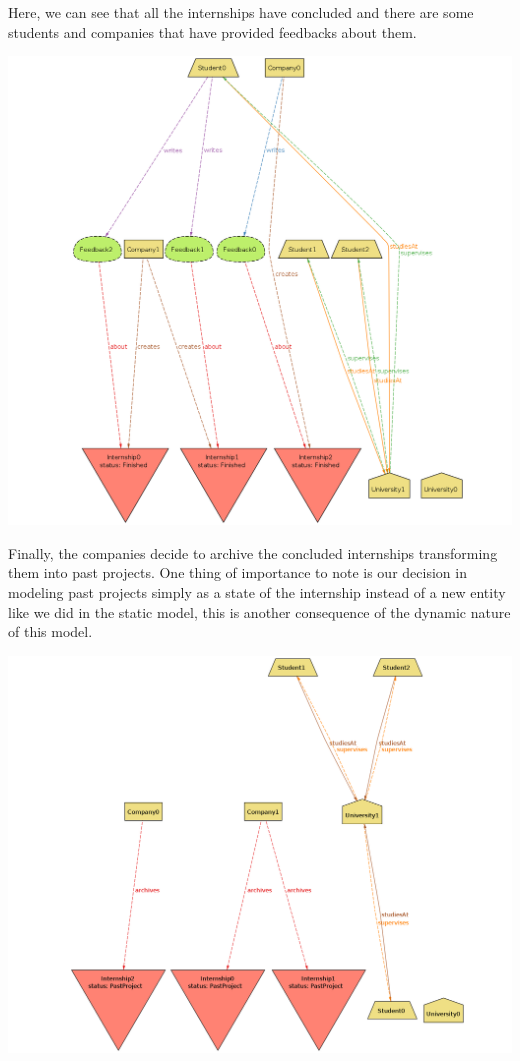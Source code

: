\documentclass[11pt,twoside]{article}
\begin{document}
\newpage
Here, we can see that all the internships have concluded and there are some students and companies that have provided feedbacks about them.
\begin{center}
\includegraphics[width=\textwidth]{Images/Scene_step3}
\end{center}
\newpage
Finally, the companies decide to archive the concluded internships transforming them into past projects. One thing of importance to note is our decision in modeling past projects simply as a state of the internship instead of a new entity like we did in the static model, this is another consequence of the dynamic nature of this model.
\begin{center}
\includegraphics[width=\textwidth]{Images/Scene_step4}
\end{center}
\newpage
\end{document}
